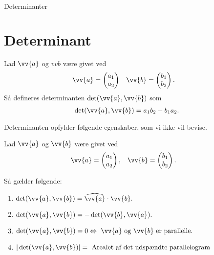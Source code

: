 \begin{center}
\Huge
Determinanter
\end{center}

\section*{Determinant}

\begin{defn}[Determinant]
	Lad $\vv{a}$ og $vv{b}$ være givet ved
	\begin{align*}
		&\vv{a} =
		\begin{pmatrix}
			a_1 \\ a_2	
		\end{pmatrix}
		&& \vv{b} = 
		\begin{pmatrix}
			b_1 \\ b_2
		\end{pmatrix}.		 		 
	\end{align*}
	Så defineres determinanten $\det(\vv{a},\vv{b})$ som
	\begin{align*}
		\det(\vv{a},\vv{b}) = a_1b_2 - b_1a_2.
	\end{align*}
\end{defn}

Determinanten opfylder følgende egenskaber, som vi ikke vil bevise.
\begin{setn}
Lad $\vv{a}$ og $\vv{b}$ være givet ved
\begin{align*}
	&\vv{a} = 
	\begin{pmatrix}
		a_1 \\ a_2
	\end{pmatrix},
	&& \vv{b} = 
	\begin{pmatrix}
		b_1 \\ b_2
	\end{pmatrix}.
\end{align*}

Så gælder følgende:
	 \begin{enumerate}[label=\roman*)]
	 	\item $\det(\vv{a},\vv{b}) = \widehat{\vv{a}}\cdot \vv{b}.$
	 	\item $\det(\vv{a},\vv{b}) = -\det(\vv{b},\vv{a}).$
	 	\item $\det(\vv{a},\vv{b})=0 \Leftrightarrow \ \vv{a}\textnormal{ og }\vv{b}
	 	\textnormal{ er parallelle.}$
	 	\item $|\det(\vv{a},\vv{b})| = \textnormal{ Arealet af det udspændte parallelogram}$
	 \end{enumerate}
\end{setn}

